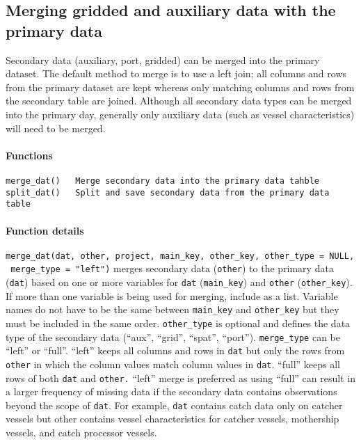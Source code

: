 \documentclass[
]{article}
\begin{document}
\hypertarget{merging-gridded-and-auxiliary-data-with-the-primary-data}{%
\subsection{Merging gridded and auxiliary data with the primary data}\label{merging-gridded-and-auxiliary-data-with-the-primary-data}}

Secondary data (auxiliary, port, gridded) can be merged into the primary dataset. The default method to merge is to use a left join; all columns and rows from the primary dataset are kept whereas only matching columns and rows from the secondary table are joined. Although all secondary data types can be merged into the primary day, generally only auxiliary data (such as vessel characteristics) will need to be merged.

\hypertarget{functions-1}{%
\paragraph{Functions}\label{functions-1}}

\begin{verbatim}
merge_dat()   Merge secondary data into the primary data tahble
split_dat()   Split and save secondary data from the primary data table
\end{verbatim}

\hypertarget{function-details-2}{%
\paragraph{Function details}\label{function-details-2}}

\texttt{merge\_dat(dat,\ other,\ project,\ main\_key,\ other\_key,\ other\_type\ =\ NULL,\ merge\_type\ =\ "left")} merges secondary data (\texttt{other}) to the primary data (\texttt{dat}) based on one or more variables for \texttt{dat} (\texttt{main\_key}) and \texttt{other} (\texttt{other\_key}). If more than one variable is being used for merging, include as a list. Variable names do not have to be the same between \texttt{main\_key} and \texttt{other\_key} but they must be included in the same order. \texttt{other\_type} is optional and defines the data type of the secondary data (``aux'', ``grid'', ``spat'', ``port''). \texttt{merge\_type} can be ``left'' or ``full''. ``left'' keeps all columns and rows in \texttt{dat} but only the rows from \texttt{other} in which the column values match column values in \texttt{dat}. ``full'' keeps all rows of both \texttt{dat} and \texttt{other.} ``left'' merge is preferred as using ``full'' can result in a larger frequency of missing data if the secondary data contains observations beyond the scope of \texttt{dat}. For example, \texttt{dat} contains catch data only on catcher vessels but other contains vessel characteristics for catcher vessels, mothership vessels, and catch processor vessels.
\end{document}
